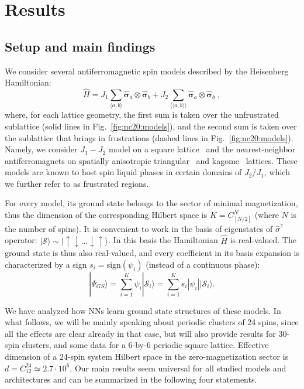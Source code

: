 \section{Results}

\subsection{Setup and main findings}

We consider several antiferromagnetic spin models described by the Heisenberg Hamiltonian:
\begin{equation}
    \hat H = J_1 \sum\limits_{\langle a, b \rangle} \hat{\boldsymbol{\sigma}}_a \otimes \hat{\boldsymbol{\sigma}}_b + J_2  \sum\limits_{\langle \langle a, b \rangle \rangle} \hat{\boldsymbol{\sigma}}_a \otimes \hat{\boldsymbol{\sigma}}_b \;,
\end{equation}
where, for each lattice geometry, the first sum is taken over the unfrustrated sublattice (solid lines in Fig.~\ref{fig:nc20:models}), and the second sum is taken over the sublattice that brings in frustrations (dashed lines in Fig.~\ref{fig:nc20:models}). Namely, we consider $J_1-J_2$ model on a square lattice~\cite{schulz1996magnetic,richter2010spin, jiang2012spin} and the nearest-neighbor antiferromagnets on spatially anisotropic triangular~\cite{yunoki2006two} and kagome~\cite{schnyder2008spatially,li2012spin} lattices. These models are known to host spin liquid phases in certain domains of $J_2/J_1$, which we further refer to as frustrated regions.

For every model, its ground state belongs to the sector of minimal magnetization, thus the dimension of the corresponding Hilbert space is $K=C^{N}_{\left[N / 2\right]}$ (where $N$ is the number of spins). It is convenient to work in the basis of eigenstates of $\hat{\sigma}^z$ operator: $|{\mathcal S}\rangle \sim |\uparrow\downarrow\dots\downarrow\uparrow\rangle$. In this basis the Hamiltonian $\hat{H}$ is real-valued. The ground state is thus also real-valued, and every coefficient in its basis expansion is characterized by a sign $s_i=\mbox{sign}(\psi_i)$ (instead of a continuous phase):
\begin{equation}
    |\Psi_{GS}\rangle = \sum\limits_{i=1}^{K} \psi_i|{\mathcal S}_i\rangle = \sum\limits_{i=1}^{K} s_i |\psi_i||{\mathcal S}_i\rangle.
\end{equation}

We have analyzed how NNs learn ground state structures of these models. In what follows, we will be mainly speaking about periodic clusters of 24 spins, since all the effects are clear already in that case, but will also provide results for 30-spin clusters, and some data for a 6-by-6 periodic square lattice. Effective dimension of a 24-spin system Hilbert space in the zero-magnetization sector is $d=C^{24}_{12}\simeq 2.7\cdot 10^6$. Our main results seem universal for all studied models and architectures and can be summarized in the following four statements.

